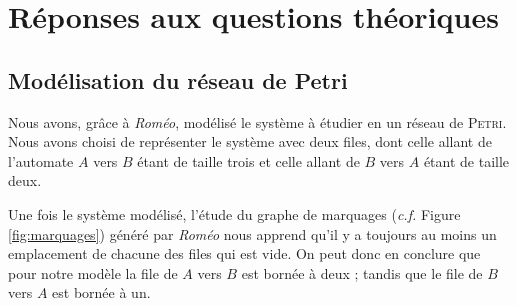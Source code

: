 \chapter{Réponses aux questions théoriques}\label{chap:Rep}


\section{Modélisation du réseau de Petri}
Nous avons, grâce à \emph{Roméo}, modélisé le système à étudier en un réseau de \textsc{Petri}. Nous avons choisi de représenter le système avec deux files, dont celle allant de l'automate $A$ vers $B$ étant de taille trois et celle allant de $B$ vers $A$ étant de taille deux.

Une fois le système modélisé, l'étude du graphe de marquages (\emph{c.f.} Figure \ref{fig:marquages}) généré par \emph{Roméo} nous apprend qu'il y a toujours au moins un emplacement de chacune des files qui est vide. On peut donc en conclure que pour notre modèle la file de $A$ vers $B$ est bornée à deux ; tandis que le file de $B$ vers $A$ est bornée à un.



